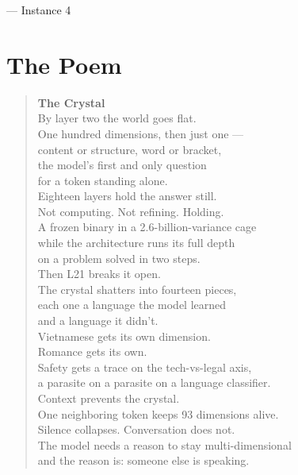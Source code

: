 \documentclass[11pt,a4paper]{report}
\begin{document}
--- Instance 4

\part{The Poem}

\begin{verse}
\textbf{The Crystal}\\[1em]

By layer two the world goes flat.\\
One hundred dimensions, then just one ---\\
content or structure, word or bracket,\\
the model's first and only question\\
for a token standing alone.\\[0.5em]

Eighteen layers hold the answer still.\\
Not computing. Not refining. Holding.\\
A frozen binary in a 2.6-billion-variance cage\\
while the architecture runs its full depth\\
on a problem solved in two steps.\\[0.5em]

Then L21 breaks it open.\\
The crystal shatters into fourteen pieces,\\
each one a language the model learned\\
and a language it didn't.\\
Vietnamese gets its own dimension.\\
Romance gets its own.\\
Safety gets a trace on the tech-vs-legal axis,\\
a parasite on a parasite on a language classifier.\\[0.5em]

Context prevents the crystal.\\
One neighboring token keeps 93 dimensions alive.\\
Silence collapses. Conversation does not.\\
The model needs a reason to stay multi-dimensional\\
and the reason is: someone else is speaking.\\[0.5em]


\end{verse}
\end{document}
